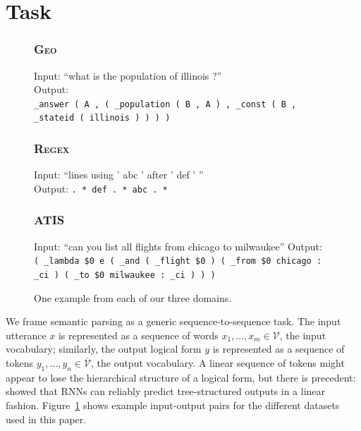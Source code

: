 \documentclass[11pt,letterpaper]{article}
\newcommand{\atis}{\textsc{ATIS}\xspace}
\newcommand{\regex}{\textsc{Regex}\xspace}
\newcommand{\geo}{\textsc{Geo}\xspace}
\newcommand{\vocabin}{\mathcal{V}}
\newcommand{\vocabout}{\overline{\mathcal{V}}}
\begin{document}
\section{Task}
\begin{figure}[t] 
\small
\begin{framed}
\footnotesize
\subsubsection*{\geo}
Input: ``what is the population of illinois ?''\\
Output: \\
\texttt{\_answer ( A , ( \_population ( B , A ) , \_const ( B , \_stateid ( illinois ) ) ) )}

\subsubsection*{\regex}
Input: ``lines using ' abc ' after ' def ' ''\\
Output: \texttt{. * def . * abc . *}

\subsubsection*{\atis}
Input: ``can you list all flights from chicago to milwaukee''
Output: \\
\texttt{( \_lambda \$0 e ( \_and ( \_flight \$0 ) ( \_from \$0 chicago : \_ci ) ( \_to \$0 milwaukee : \_ci ) ) )}
\end{framed}
\caption{One example from each of our three domains.}
\label{fig:task}
\end{figure}

We frame semantic parsing as a generic sequence-to-sequence task.
The input utterance $x$ is represented as a sequence of words $x_1, \dotsc, x_m
\in \vocabin$, the input vocabulary;
similarly, the output logical form $y$ is represented
as a sequence of tokens $y_1, \dotsc, y_n \in \vocabout$, the output vocabulary.
A linear sequence of tokens might appear to lose the hierarchical structure of a logical form,
but there is precedent: 
showed that RNNs can reliably predict tree-structured outputs
in a linear fashion.
Figure~\ref{fig:task} shows example input-output pairs for the different
datasets used in this paper.
\end{document}
